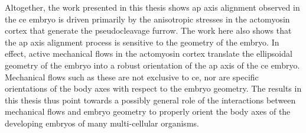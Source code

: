 Altogether, the work presented in this thesis shows \acs{ap} axis alignment observed in the \acs{ce} embryo is driven primarily by the anisotropic stresses in the actomyosin cortex that generate the pseudocleavage furrow. The work here also shows that the \acs{ap} axis alignment process is sensitive to the geometry of the embryo. In effect, active mechanical flows in the actomyosin cortex translate the ellipsoidal geometry of the embryo into a robust orientation of the \acs{ap} axis of the \acs{ce} embryo. Mechanical flows such as these are not exclusive to \acs{ce}, nor are specific orientations of the body axes with respect to the embryo geometry. The results in this thesis thus point towards a possibly general role of the interactions between mechanical flows and embryo geometry to properly orient the body axes of the developing embryos of many multi-cellular organisms.